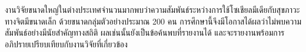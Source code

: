 งานวิจัยขนาดใหญ่ในต่างประเทศจำนวนมากพบว่าความสัมพันธ์ระหว่างการใช้โซเชียลมีเดียกับสุขภาวะทางจิตมีขนาดเล็ก
ด้วยขนาดกลุ่มตัวอย่างประมาณ 200 คน การศึกษานี้จึงมีโอกาสได้ผลว่าไม่พบความสัมพันธ์อย่างมีนัยสำคัญทางสถิติ
ผลเช่นนั้นยังเป็นข้อค้นพบที่รายงานได้
และจะรายงานพร้อมการอภิปรายเปรียบเทียบกับงานวิจัยที่เกี่ยวข้อง
